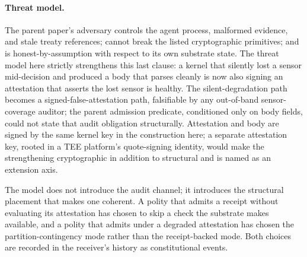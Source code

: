 \paragraph{Threat model.}
The parent paper's adversary controls the agent process, malformed evidence, and stale treaty references; cannot break the listed cryptographic primitives; and is honest-by-assumption with respect to its own substrate state. The threat model here strictly strengthens this last clause: a kernel that silently lost a sensor mid-decision and produced a body that parses cleanly is now also signing an attestation that asserts the lost sensor is healthy. The silent-degradation path becomes a signed-false-attestation path, falsifiable by any out-of-band sensor-coverage auditor; the parent admission predicate, conditioned only on body fields, could not state that audit obligation structurally. Attestation and body are signed by the same kernel key in the construction here; a separate attestation key, rooted in a TEE platform's quote-signing identity, would make the strengthening cryptographic in addition to structural and is named as an extension axis.

The model does not introduce the audit channel; it introduces the structural placement that makes one coherent. A polity that admits a receipt without evaluating its attestation has chosen to skip a check the substrate makes available, and a polity that admits under a degraded attestation has chosen the partition-contingency mode rather than the receipt-backed mode. Both choices are recorded in the receiver's history as constitutional events.
